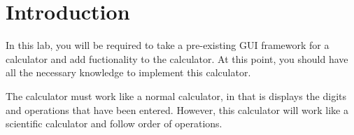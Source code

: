 \section{Introduction}

In this lab, you will be required to take a pre-existing GUI framework for a calculator and add fuctionality to the calculator. At this point, you should have all the necessary knowledge to implement this calculator. 

The calculator must work like a normal calculator, in that is displays the digits and operations that have been entered. However, this calculator will work like a scientific calculator and follow order of operations.